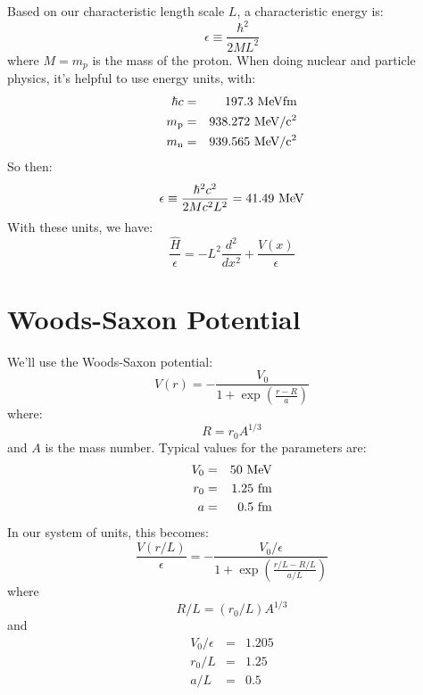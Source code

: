 \documentclass[12pt]{article}
\begin{document}
Based on our characteristic length scale $L$, a characteristic energy is:
\begin{equation}
\epsilon \equiv \frac{\hbar^2}{2 M L^2}
\end{equation}
where $M = m_p$ is the mass of the proton.  When doing nuclear and particle physics, it's helpful to use energy units, with:
\begin{eqnarray*}
\hbar c   &=& 197.3~\rm MeV fm \\
m_{\rm p} &=& 938.272~\rm MeV/c^2\\
m_{\rm n} &=& 939.565~\rm MeV/c^2\\
\end{eqnarray*}
So then:
\begin{equation}
\epsilon \equiv \frac{\hbar^2 c^2}{2 Mc^2 L^2} = 41.49~\rm MeV
\end{equation}
With these units, we have:
\begin{equation}
\frac{\hat{H}}{\epsilon} = -L^2\frac{d^2}{dx^2} + \frac{V(x)}{\epsilon}
\end{equation}

\section{Woods-Saxon Potential}

We'll use the Woods-Saxon potential:
\begin{equation}
V(r) = -\frac{V_0}{1 + \exp\left( \frac{r-R}{a} \right)}
\end{equation}
where:
\begin{equation}
R = r_0 A^{1/3} 
\end{equation}
and $A$ is the mass number.  Typical values for the parameters are:
\begin{eqnarray*}
V_0 &=& 50 ~ {\rm MeV} \\
r_0 &=& 1.25 ~ {\rm fm}\\
a   &=& 0.5 ~ {\rm fm}\\
\end{eqnarray*}
In our system of units, this becomes:
\begin{equation}
\frac{V(r/L)}{\epsilon} = -\frac{V_0/\epsilon}{1 + \exp\left( \frac{r/L-R/L}{a/L} \right)}
\end{equation}
where
$$R/L = (r_0/L) A^{1/3} $$
and
\begin{eqnarray*}
V_0/\epsilon &=& 1.205 \\
r_0/L &=& 1.25 \\
a/L   &=& 0.5 \\
\end{eqnarray*}
\end{document}
